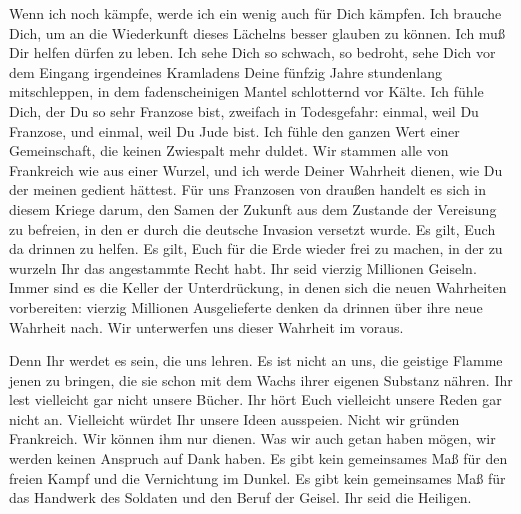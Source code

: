 \documentclass[12pt,ngerman,twocolumn]{article}
\begin{document}
Wenn ich noch kämpfe, werde ich ein wenig auch für Dich kämpfen. Ich brauche Dich, um an die Wiederkunft dieses Lächelns besser glauben zu können. Ich muß Dir helfen dürfen zu leben. Ich sehe Dich so schwach, so bedroht, sehe Dich vor dem Eingang irgendeines Kramladens Deine fünfzig Jahre stundenlang mitschleppen, in dem fadenscheinigen Mantel schlotternd vor Kälte. Ich fühle Dich, der Du so sehr Franzose bist, zweifach in Todesgefahr: einmal, weil Du Franzose, und einmal, weil Du Jude bist. Ich fühle den ganzen Wert einer Gemeinschaft, die keinen Zwiespalt mehr duldet. Wir stammen alle von Frankreich wie aus einer Wurzel, und ich werde Deiner Wahrheit dienen, wie Du der meinen gedient hättest. Für uns Franzosen von draußen handelt es sich in diesem Kriege darum, den Samen der Zukunft aus dem Zustande der Vereisung zu befreien, in den er durch die deutsche Invasion versetzt wurde. Es gilt, Euch da drinnen zu helfen. Es gilt, Euch für die Erde wieder frei zu machen, in der zu wurzeln Ihr das angestammte Recht habt. Ihr seid vierzig Millionen Geiseln. Immer sind es die Keller der Unterdrückung, in denen sich die neuen Wahrheiten vorbereiten: vierzig Millionen Ausgelieferte denken da drinnen über ihre neue Wahrheit nach. Wir unterwerfen uns dieser Wahrheit im voraus.

Denn Ihr werdet es sein, die uns lehren. Es ist nicht an uns, die geistige Flamme jenen zu bringen, die sie schon mit dem Wachs ihrer eigenen Substanz nähren. Ihr lest vielleicht gar nicht unsere Bücher. Ihr hört Euch vielleicht unsere Reden gar nicht an. Vielleicht würdet Ihr unsere Ideen ausspeien. Nicht wir gründen Frankreich. Wir können ihm nur dienen. Was wir auch getan haben mögen, wir werden keinen Anspruch auf Dank haben. Es gibt kein gemeinsames Maß für den freien Kampf und die Vernichtung im Dunkel. Es gibt kein gemeinsames Maß für das Handwerk des Soldaten und den Beruf der Geisel. Ihr seid die Heiligen.
\end{document}
